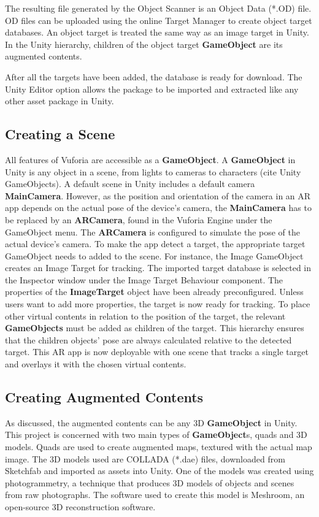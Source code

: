 The resulting file generated by the Object Scanner is an Object Data (*.OD) file. OD files can be uploaded using the online Target Manager to create object target databases. An object target is treated the same way as an image target in Unity. In the Unity hierarchy, children of the object target \textbf{GameObject} are its augmented contents.

After all the targets have been added, the database is ready for download. The Unity Editor option allows the package to be imported and extracted like any other asset package in Unity.

\subsection{Creating a Scene}
All features of Vuforia are accessible as a \textbf{GameObject}. A \textbf{GameObject} in Unity is any object in a scene, from lights to cameras to characters (cite Unity GameObjects). A default scene in Unity includes a default camera \textbf{MainCamera}. However, as the position and orientation of the camera in an AR app depends on the actual pose of the device's camera, the \textbf{MainCamera} has to be replaced by an \textbf{ARCamera}, found in the Vuforia Engine under the GameObject menu. The \textbf{ARCamera} is configured to simulate the pose of the actual device's camera. To make the app detect a target, the appropriate target GameObject needs to added to the scene. For instance, the Image GameObject creates an Image Target for tracking. The imported target database is selected in the Inspector window under the Image Target Behaviour component. The properties of the \textbf{ImageTarget} object have been already preconfigured. Unless users want to add more properties, the target is now ready for tracking. To place other virtual contents in relation to the position of the target,  the relevant \textbf{GameObjects} must be added as children of the target. This hierarchy ensures that the children objects' pose are always calculated relative to the detected target. This AR app is now deployable with one scene that tracks a single target and overlays it with the chosen virtual contents.

\subsection{Creating Augmented Contents}
As discussed, the augmented contents can be any 3D \textbf{GameObject} in Unity. This project is concerned with two main types of \textbf{GameObject}s, quads and 3D models. Quads are used to create augmented maps, textured with the actual map image. The 3D models used are COLLADA (*.dae) files, downloaded from Sketchfab and imported as assets into Unity. One of the models was created using photogrammetry, a technique that produces 3D models of objects and scenes from raw photographs. The software used to create this model is Meshroom, an open-source 3D reconstruction software.

